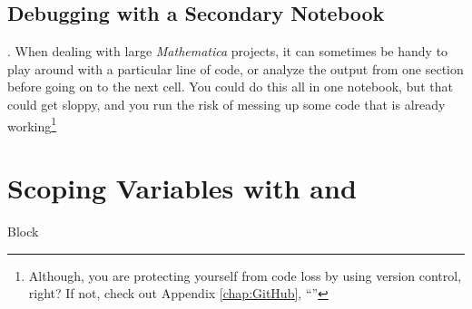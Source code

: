 \subsection{Debugging with a Secondary Notebook}. When dealing with large \emph{Mathematica} projects, it can sometimes be handy to play around with a particular line of code, or analyze the output from one section before going on to the next cell. You could do this all in one notebook, but that could get sloppy, and you run the risk of messing up some code that is already working\footnote{Although, you are protecting yourself from code loss by using version control, right? If not, check out Appendix \ref{chap:GitHub}, ``''}

\section{Scoping Variables with  and }

\begin{code}
	   Block
\end{code}
